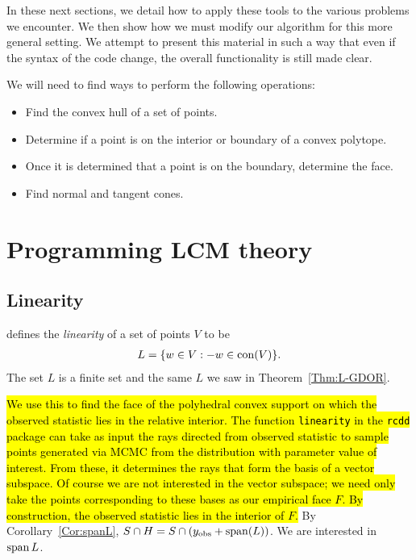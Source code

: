 In these next sections, we detail how to apply these tools to the various problems we encounter.  We then show how we must modify our algorithm for this more general setting.
We attempt to present this material in such a way that even if the syntax of the 
code change, the overall functionality is still made clear.

We will need to find ways to perform the following operations:
\begin{itemize}
\item Find the convex hull of a set of points.
\item Determine if a point is on the interior or boundary of a convex polytope.
\item Once it is determined that a point is on the boundary, determine the face.
\item Find normal and tangent cones.
\end{itemize}
\section{Programming LCM theory}
 \citep{rcdd}

\subsection{Linearity}\label{S:linearity}
\citet{Geyer:gdor} defines the \emph{linearity} of a set of points $V$ to be
\begin{align*}
	L = \{ w \in V: -w \in \operatorname{con}( V ) \}.
\end{align*}
The set $L$ is a finite set and the same $L$ we saw in Theorem~\ref{Thm:L-GDOR}.

\hl{We use this to find the face of the polyhedral convex support on which the observed 
statistic lies in the relative interior.  The function \texttt{linearity} in the \texttt
{rcdd} package can take as input the rays directed from observed statistic to sample 
points generated via MCMC from the distribution with parameter value of interest.  
From these, it determines the rays that form the basis of a vector subspace.  
Of course we are not interested in the vector subspace; we need only take the points 
corresponding to these bases as our empirical face $F$.  By construction, the observed 
statistic lies in the interior of $F$.}  By Corollary~\ref{Cor:spanL}, 
$S \cap H = S \cap(y_{\text{obs}} + \operatorname{span} (L))$.  We are interested in $\operatorname{span} L$.


